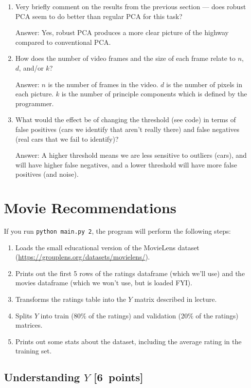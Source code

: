 \documentclass{article}
\newcommand{\gre}[1]{\textcolor{gre}{#1}}
\newcommand\ans[1]{\par\gre{Answer: #1}}
\newcommand\pts[1]{\textcolor{pointscolour}{[#1~points]}}
\begin{document}
\begin{enumerate}
	\item Very briefly comment on the results from the previous section --- does robust PCA seem to do better than regular PCA for this task?
    \ans{Yes, robust PCA produces a more clear picture of the highway compared to conventional PCA. }
	
    \item How does the number of video frames and the size of each frame relate to $n$, $d$, and/or $k$?
    \ans{$n$ is the number of frames in the video. $d$ is the number of pixels in each picture. $k$ is the number of principle components which is defined by the programmer.}
	
    \item What would the effect be of changing the threshold (see code) in terms of false positives (cars we identify that aren't really there) and false negatives (real cars that we fail to identify)?
    \ans{A higher threshold means we are less sensitive to outliers (cars), and will have higher false negatives, and a lower threshold will have more false positives (and noise).}
\end{enumerate}

\newpage
\section{Movie Recommendations}

If you run \texttt{python main.py 2}, the program will perform the following steps:

\begin{enumerate}
\item Loads the small educational version of the MovieLens dataset (\url{https://grouplens.org/datasets/movielens/}).
\item Prints out the first 5 rows of the ratings dataframe (which we'll use) and the movies dataframe (which we won't use, but is loaded FYI).
\item Transforms the ratings table into the $Y$ matrix described in lecture.
\item Splits $Y$ into train (80\% of the ratings) and validation (20\% of the ratings) matrices.
\item Prints out some stats about the dataset, including the average rating in the training set.
\end{enumerate}

\subsection{Understanding $Y$ \pts{6}}
\end{document}
